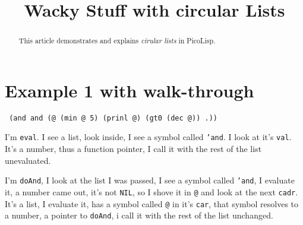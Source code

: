\title{Wacky Stuff with circular Lists}

\maketitle






% 



\begin{abstract}
  This article demonstrates and explains \emph{cirular lists} in
  PicoLisp.
\end{abstract}

\section{Example 1 with walk-through}
\label{sec:circ-lists-example-1-with-walk-through}

\texttt{ (and and (@ (min @ 5) (prinl @) (gt0 (dec @)) .)) }

I'm \texttt{eval}. I see a list, look inside, I see a symbol called
\texttt{'and}. I look at it's \texttt{val}. It's a number, thus a
function pointer, I call it with the rest of the list unevaluated.

I'm \texttt{doAnd}, I look at the list I was passed, I see a symbol
called \texttt{'and}, I evaluate it, a number came out, it's not
\texttt{NIL}, so I shove it in \texttt{@} and look at the next
\texttt{cadr}. It's a list, I evaluate it, has a symbol called
\texttt{@} in it's \texttt{car}, that symbol resolves to a number, a
pointer to \texttt{doAnd}, i call it with the rest of the list
unchanged.

